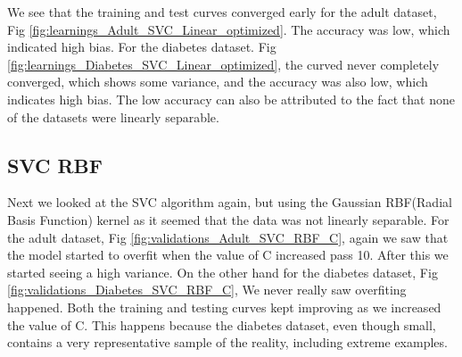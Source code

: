 \documentclass[11pt, twocolumn]{article}
\begin{document}
    We see that the training and test curves converged early for the adult dataset, Fig \ref{fig:learnings_Adult_SVC_Linear_optimized}. The accuracy was low, which indicated high bias. For the diabetes dataset. Fig \ref{fig:learnings_Diabetes_SVC_Linear_optimized}, the curved never completely converged, which shows some variance, and the accuracy was also low, which indicates high bias. The low accuracy can also be attributed to the fact that none of the datasets were linearly separable.

    \subsection{SVC RBF}

    Next we looked at the SVC algorithm again, but using the Gaussian RBF(Radial Basis Function) kernel as it seemed that the data was not linearly separable. For the adult dataset, Fig \ref{fig:validations_Adult_SVC_RBF_C}, again we saw that the model started to overfit when the value of C increased pass 10. After this we started seeing a high variance. On the other hand for the diabetes dataset, Fig \ref{fig:validations_Diabetes_SVC_RBF_C}, We never really saw overfiting happened. Both the training and testing curves kept improving as we increased the value of C. This happens because the diabetes dataset, even though small, contains a very representative sample of the reality, including extreme examples.
\end{document}
